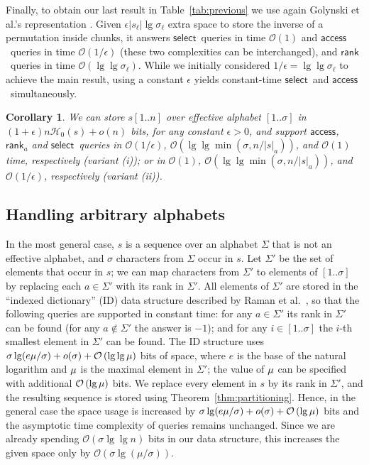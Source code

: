 \documentclass[11pt]{article}
\newtheorem{corollary}[theorem]{Corollary}
\newcommand{\Oh}[1]
    {\ensuremath{\mathcal{O}\left( {#1} \right)}}
\newcommand{\occ}[2]
    {\ensuremath{|{#2}|_{#1}}}
\newcommand{\access}
    {\ensuremath{\mathsf{access}}}
\newcommand{\rank}
    {\ensuremath{\mathsf{rank}}}
\newcommand{\select}
    {\ensuremath{\mathsf{select}}}
\newcommand{\HH}{\mathcal{H}}
\newcommand{\Ho}{\HH_0}
\newcommand{\mFromRaman}{\ensuremath\mu}
\begin{document}
Finally, to obtain our last result in Table~\ref{tab:previous} we use again
Golynski et al.'s representation \cite[Thm.~4.2]{GMR06}. Given 
$\epsilon |s_\ell| \lg \sigma_\ell$ extra space to store the inverse of a
permutation inside chunks, it answers \select\ queries in time $\Oh{1}$ 
and \access\ queries in time $\Oh{1/\epsilon}$ (these two complexities can be
interchanged), and \rank\ queries in time
$\Oh{\lg\lg\sigma_\ell}$. While we initially considered
$1/\epsilon = \lg\lg\sigma_\ell$ to achieve the main result, using a constant
$\epsilon$ yields constant-time \select\ and \access\ simultaneously.

\begin{corollary} \label{cor:partitioning-constant}
We can store $s[1..n]$ over effective alphabet $[1..\sigma]$ in
\((1+\epsilon) n \Ho (s) + o(n)\) bits, for any constant $\epsilon>0$, and 
support \access, $\rank_a$ and \select\ queries in
$\Oh{1/\epsilon}$, $\Oh{\lg \lg \min(\sigma,n/\occ{a}{s})}$, and $\Oh{1}$ time,
respectively (variant (i)); or in $\Oh{1}$, $\Oh{\lg \lg
\min(\sigma,n/\occ{a}{s})}$, and $\Oh{1/\epsilon}$, respectively (variant
(ii)).
\end{corollary}

\subsection{Handling arbitrary alphabets} \label{sec:effective}

In the most general case, $s$ is a sequence over an alphabet $\Sigma$
that is not an effective alphabet, and $\sigma$ characters from $\Sigma$
occur in $s$.
Let $\Sigma'$ be the set of elements that occur in $s$; we can map
characters from $\Sigma'$ to elements of $[1..\sigma]$ by replacing
each $a\in \Sigma'$ with its rank in $\Sigma'$.
All elements of $\Sigma'$ are stored in the ``indexed dictionary'' (ID) data
structure described by Raman et al.~\cite{RRR02}, so that the
following queries are supported in constant time:
for any $a\in\Sigma'$ its rank in $\Sigma'$ can be found (for any
$a\not\in \Sigma'$ the answer is $-1$);
and for any $i\in [1..\sigma]$ the $i$-th smallest element in $\Sigma'$
can be found. The ID structure uses
$\sigma\lg(e\mFromRaman/\sigma)+o(\sigma)+\Oh{\lg\lg\mFromRaman}$ bits
of space, where
$e$ is the base of the natural logarithm and
$\mFromRaman$ is the maximal element in $\Sigma'$;
the value of $\mFromRaman$ can be specified with additional
$\Oh{\lg\mFromRaman}$ bits.
We replace every element in $s$ by its rank in $\Sigma'$, and the
resulting sequence is stored using Theorem~\ref{thm:partitioning}.
Hence, in the general case the space usage is increased by
$\sigma\lg(e\mFromRaman/\sigma)+o(\sigma)+\Oh{\lg\mFromRaman}$ bits and
the asymptotic time complexity of queries remains unchanged.
Since we are already spending $\Oh{\sigma\lg\lg n}$ bits in our data
structure, this increases the given space only by 
$\Oh{\sigma \lg(\mu/\sigma)}$.
\end{document}
